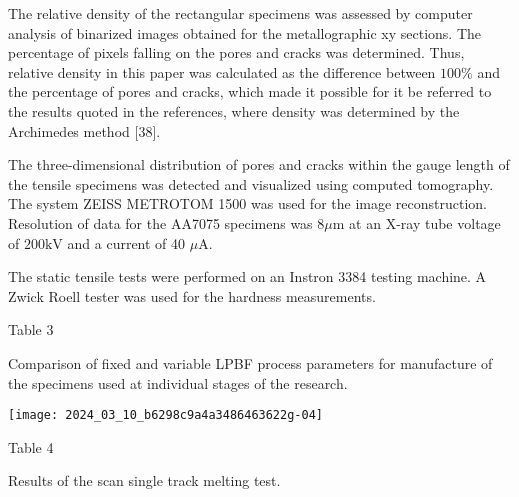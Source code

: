 \documentclass[10pt]{article}
\begin{document}
The relative density of the rectangular specimens was assessed by computer analysis of binarized images obtained for the metallographic xy sections. The percentage of pixels falling on the pores and cracks was determined. Thus, relative density in this paper was calculated as the difference between $100 \%$ and the percentage of pores and cracks, which made it possible for it be referred to the results quoted in the references, where density was determined by the Archimedes method [38].

The three-dimensional distribution of pores and cracks within the gauge length of the tensile specimens was detected and visualized using computed tomography. The system ZEISS METROTOM 1500 was used for the image reconstruction. Resolution of data for the AA7075 specimens was $8 \mu \mathrm{m}$ at an X-ray tube voltage of $200 \mathrm{kV}$ and a current of 40 $\mu \mathrm{A}$.

The static tensile tests were performed on an Instron 3384 testing machine. A Zwick Roell tester was used for the hardness measurements.

Table 3

Comparison of fixed and variable LPBF process parameters for manufacture of the specimens used at individual stages of the research.

\begin{center}
\texttt{[image: 2024\_03\_10\_b6298c9a4a3486463622g-04]}
\end{center}

Table 4

Results of the scan single track melting test.
\end{document}

